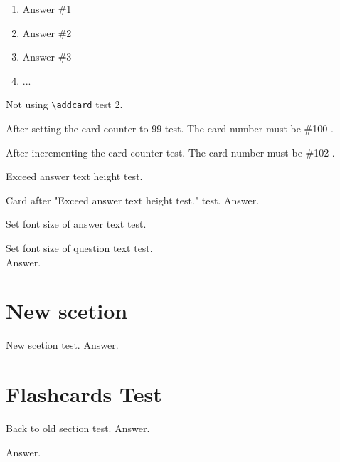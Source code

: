 \documentclass{../flashcards}
\begin{document}
{
\begin{enumerate}
\item Answer \#1
\item Answer \#2
\item Answer \#3
\item ...
\end{enumerate}
}

Not using \verb|\addcard| test 2. \newpage

\setcounter{cards}{99}
\addcard
{
After setting the card counter to 99 test.
}
{
The card number must be \#100 .
}

\addcard
{
After incrementing the card counter test.
}
{
The card number must be \#102 .
}

\addcard
{
Exceed answer text height test.
}
{
\blindtext[3]
}

\addcard
{
Card after "Exceed answer text height test." test.
}
{
Answer.
}

\addcard
{
Set font size of answer text test.
}
{
\footnotesize
\blindtext[3]
}

\addcard
{
Set font size of question text test.\\
\footnotesize
\blindtext[2]
}
{
Answer.
}

\section{New scetion}
\addcard
{
New scetion test.
}
{
Answer.
}

\section{Flashcards Test}
\addcard
{
Back to old section test.
}
{
Answer.
}

{
Answer.
}

\listofcards

\printindex
\end{document}
